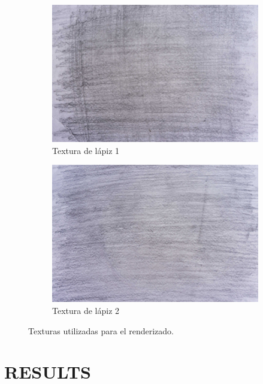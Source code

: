 \documentclass[letterpaper, 10 pt, conference]{ieeeconf}  %
\begin{document}
\begin{figure}[H]
\centering
    \begin{subfigure}{0.45\linewidth}
\includegraphics[width=\linewidth, scale=0.05]{images/texture_1.jpg} 
    \caption{Textura de lápiz 1}
\label{fig:1a}
    \end{subfigure}\hfill
    \begin{subfigure}{0.45\linewidth}
\includegraphics[width=\linewidth, scale=0.1]{images/texture_2.jpg}
    \caption{Textura de lápiz 2}
\label{dib-hist}
    \end{subfigure}
\caption{Texturas utilizadas para el renderizado.}
    \label{textura}
    \end{figure}





\section{RESULTS}
\end{document}
